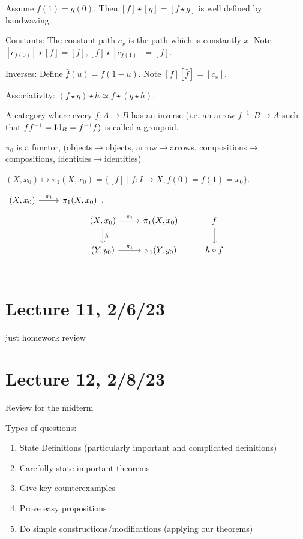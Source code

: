 \documentclass[x11names,reqno,14pt]{extarticle}
\begin{document}

Assume $f(1) = g(0)$. Then $[f]\star[g] = [f\star g]$ is well defined by handwaving. 

Constants: The constant path $c_x$ is the path which is constantly $x$. Note $[c_{f(0)}]\star[f] = [f], [f]\star[c_{f(1)}] = [f]$. 

Inverses: Define $\bar{f}(u) = f(1 - u)$. Note $[f][\bar{f}] = [c_x]$. 

Associativity: $(f\star g)\star h \simeq f\star(g\star h)$. 

 A category where every $f:A\to B$ has an inverse (i.e. an arrow $f^{-1}:B\to A$ such that $ff^{-1} = \operatorname{\mathrm{Id}}_B = f^{-1}f)$ is called a \underline{groupoid}. 

$\pi_0$ is a functor, (objects$\to$objects, arrow$\to$arrows, compositions$\to$compositions, identities$\to$identities)

$(X, x_0) \mapsto \pi_1(X, x_0) = \{[f]\mid f:I\to X, f(0) = f(1) = x_0\}$. 

$\begin{tikzcd} (X, x_0)\ar[r, "\pi_1"]&\pi_1(X, x_0) \end{tikzcd}$. 
\[
\begin{tikzcd}
(X, x_0)\ar[d, "h"]\ar[r, "\pi_1"]&\pi_1(X, x_0) & f \ar[d] \\
(Y, y_0) \ar[r, "\pi_1"]&\pi_1(Y, y_0) & h\circ f \\
\end{tikzcd}
\]

\section*{Lecture 11, 2/6/23}

just homework review

\section*{Lecture 12, 2/8/23}

Review for the midterm

Types of questions:

\begin{enumerate}

\item State Definitions (particularly important and complicated definitions)

\item Carefully state important theorems

\item Give key counterexamples

\item Prove easy propositions

\item Do simple constructions/modifications (applying our theorems)

\end{enumerate}
\end{document}
